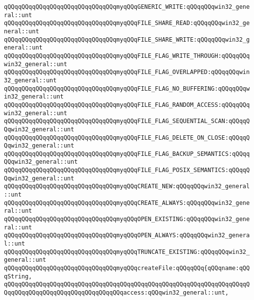 \verb|qQQqqQQqqQQqqQQqqQQqqQQqqQQqqQQqmyqQQqGENERIC_WRITE:qQQqqQQqwin32_general::unt|\newline
\newline
\verb|qQQqqQQqqQQqqQQqqQQqqQQqqQQqqQQqmyqQQqFILE_SHARE_READ:qQQqqQQqwin32_general::unt|\newline
\verb|qQQqqQQqqQQqqQQqqQQqqQQqqQQqqQQqmyqQQqFILE_SHARE_WRITE:qQQqqQQqwin32_general::unt|\newline
\newline
\verb|qQQqqQQqqQQqqQQqqQQqqQQqqQQqqQQqmyqQQqFILE_FLAG_WRITE_THROUGH:qQQqqQQqwin32_general::unt|\newline
\verb|qQQqqQQqqQQqqQQqqQQqqQQqqQQqqQQqmyqQQqFILE_FLAG_OVERLAPPED:qQQqqQQqwin32_general::unt|\newline
\verb|qQQqqQQqqQQqqQQqqQQqqQQqqQQqqQQqmyqQQqFILE_FLAG_NO_BUFFERING:qQQqqQQqwin32_general::unt|\newline
\verb|qQQqqQQqqQQqqQQqqQQqqQQqqQQqqQQqmyqQQqFILE_FLAG_RANDOM_ACCESS:qQQqqQQqwin32_general::unt|\newline
\verb|qQQqqQQqqQQqqQQqqQQqqQQqqQQqqQQqmyqQQqFILE_FLAG_SEQUENTIAL_SCAN:qQQqqQQqwin32_general::unt|\newline
\verb|qQQqqQQqqQQqqQQqqQQqqQQqqQQqqQQqmyqQQqFILE_FLAG_DELETE_ON_CLOSE:qQQqqQQqwin32_general::unt|\newline
\verb|qQQqqQQqqQQqqQQqqQQqqQQqqQQqqQQqmyqQQqFILE_FLAG_BACKUP_SEMANTICS:qQQqqQQqwin32_general::unt|\newline
\verb|qQQqqQQqqQQqqQQqqQQqqQQqqQQqqQQqmyqQQqFILE_FLAG_POSIX_SEMANTICS:qQQqqQQqwin32_general::unt|\newline
\newline
\verb|qQQqqQQqqQQqqQQqqQQqqQQqqQQqqQQqmyqQQqCREATE_NEW:qQQqqQQqwin32_general::unt|\newline
\verb|qQQqqQQqqQQqqQQqqQQqqQQqqQQqqQQqmyqQQqCREATE_ALWAYS:qQQqqQQqwin32_general::unt|\newline
\verb|qQQqqQQqqQQqqQQqqQQqqQQqqQQqqQQqmyqQQqOPEN_EXISTING:qQQqqQQqwin32_general::unt|\newline
\verb|qQQqqQQqqQQqqQQqqQQqqQQqqQQqqQQqmyqQQqOPEN_ALWAYS:qQQqqQQqwin32_general::unt|\newline
\verb|qQQqqQQqqQQqqQQqqQQqqQQqqQQqqQQqmyqQQqTRUNCATE_EXISTING:qQQqqQQqwin32_general::unt|\newline
\newline
\verb|qQQqqQQqqQQqqQQqqQQqqQQqqQQqqQQqmyqQQqcreateFile:qQQqqQQq{qQQqname:qQQqString,|\newline
\verb|qQQqqQQqqQQqqQQqqQQqqQQqqQQqqQQqqQQqqQQqqQQqqQQqqQQqqQQqqQQqqQQqqQQqqQQqqQQqqQQqqQQqqQQqqQQqqQQqqQQqqQQqaccess:qQQqwin32_general::unt,|\newline
